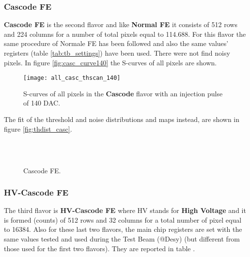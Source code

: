 \subsubsection{Cascode FE}

\textbf{Cascode FE} is the second flavor and like \textbf{Normal FE} it consists of 512 rows and 224 columns for a number of total pixels equal to 114.688. For this flavor the same procedure of Normale FE has been followed and also the same values' registers (table \vref{tab:tb_settings}) have been used. There were not find noisy pixels. 
In figure \vref{fig:casc_curve140} the S-curves of all pixels are shown.

\begin{figure}[h!]
\centering
\texttt{[image: all\_casc\_thscan\_140]}
\caption{S-curves of all pixels in the \textbf{Cascode} flavor with an injection pulse of 140 DAC.}
\label{fig:casc_scurve140}
\end{figure}

The fit of the threshold and noise distributions and maps instead, are shown in figure \vref{fig:thdist_casc}.


\begin{figure}[h!]
\centering
{}\quad
{}\\
\quad
{}\\
\caption{Cascode FE.}
\label{fig:norm}
\end{figure}




\subsubsection{HV-Cascode FE}


The third flavor is \textbf{HV-Cascode FE} where HV stands for \textbf{High Voltage} and it is formed (counts) of 512 rows and 32 columns for a total number of pixel equal to 16384. Also for these last two flavors, the main chip registers are set with the same values tested and used during the Test Beam (@Desy) (but different from those used for the first two flavors). They are reported in table  .

